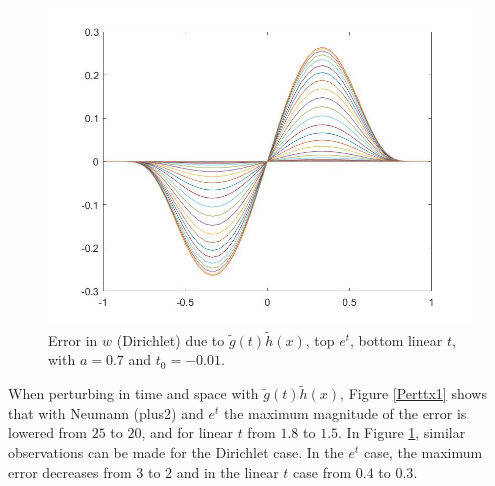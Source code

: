 \documentclass[11pt, a4paper]{article}
\theoremstyle{definition}
\begin{document}
\begin{figure}[h]
	\includegraphics[scale=0.3]{PerttxD4.jpg}
	\caption{Error in $w$ (Dirichlet) due to $\tilde g(t) \tilde h(x)$, top $e^t$, bottom linear $t$, with $a =0.7$ and $t_0 = -0.01$.}
	\label{Perttx2}
\end{figure}
When perturbing in time and space with $\tilde g(t) \tilde h(x)$, Figure \ref{Perttx1} shows that with Neumann (plus2) and $e^t$ the maximum magnitude of the error is lowered from $25$ to $20$, and for linear $t$ from $1.8$ to $1.5$.
In Figure \ref{Perttx2}, similar observations can be made for the Dirichlet case. In the $e^t$ case, the maximum error decreases from $3$ to $2$ and in the linear $t$ case from $0.4$ to $0.3$.
\end{document}

